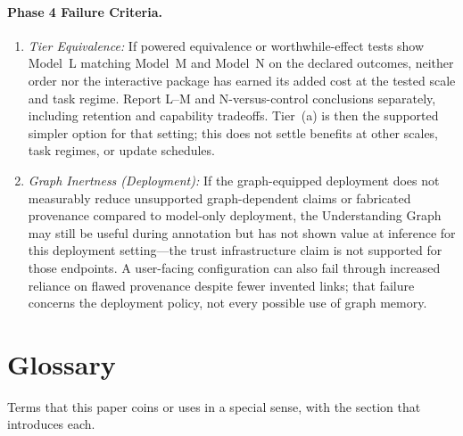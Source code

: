 \documentclass[11pt]{article}
\begin{document}
\paragraph{Phase 4 Failure Criteria.}
\begin{enumerate}
    \item \emph{Tier Equivalence:} If powered equivalence or worthwhile-effect tests show Model~L matching Model~M and Model~N on the declared outcomes, neither order nor the interactive package has earned its added cost at the tested scale and task regime. Report L--M and N-versus-control conclusions separately, including retention and capability tradeoffs. Tier~(a) is then the supported simpler option for that setting; this does not settle benefits at other scales, task regimes, or update schedules.
    \item \emph{Graph Inertness (Deployment):} If the graph-equipped deployment does not measurably reduce unsupported graph-dependent claims or fabricated provenance compared to model-only deployment, the Understanding Graph may still be useful during annotation but has not shown value at inference for this deployment setting---the trust infrastructure claim is not supported for those endpoints. A user-facing configuration can also fail through increased reliance on flawed provenance despite fewer invented links; that failure concerns the deployment policy, not every possible use of graph memory.
\end{enumerate}


\section{Glossary}\label{app:glossary}

Terms that this paper coins or uses in a special sense, with the section that
introduces each.
\end{document}
